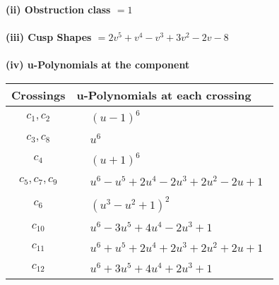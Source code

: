 \documentclass[1p]{elsarticle_modified}
\theoremstyle{definition}
\begin{document}
\flushleft \textbf{(ii) Obstruction class $= 1$}\\~\\
\flushleft \textbf{(iii) Cusp Shapes $= 2 v^5+v^4- v^3+3 v^2-2 v-8$}\\~\\
\newpage\renewcommand{\arraystretch}{1}
\flushleft \textbf{(iv) u-Polynomials at the component}\newline \\
\begin{tabular}{m{50pt}|m{274pt}}
Crossings & \hspace{64pt}u-Polynomials at each crossing \\
\hline $$\begin{aligned}c_{1},c_{2}\end{aligned}$$&$\begin{aligned}
&(u-1)^6
\end{aligned}$\\
\hline $$\begin{aligned}c_{3},c_{8}\end{aligned}$$&$\begin{aligned}
&u^6
\end{aligned}$\\
\hline $$\begin{aligned}c_{4}\end{aligned}$$&$\begin{aligned}
&(u+1)^6
\end{aligned}$\\
\hline $$\begin{aligned}c_{5},c_{7},c_{9}\end{aligned}$$&$\begin{aligned}
&u^6- u^5+2 u^4-2 u^3+2 u^2-2 u+1
\end{aligned}$\\
\hline $$\begin{aligned}c_{6}\end{aligned}$$&$\begin{aligned}
&(u^3- u^2+1)^2
\end{aligned}$\\
\hline $$\begin{aligned}c_{10}\end{aligned}$$&$\begin{aligned}
&u^6-3 u^5+4 u^4-2 u^3+1
\end{aligned}$\\
\hline $$\begin{aligned}c_{11}\end{aligned}$$&$\begin{aligned}
&u^6+u^5+2 u^4+2 u^3+2 u^2+2 u+1
\end{aligned}$\\
\hline $$\begin{aligned}c_{12}\end{aligned}$$&$\begin{aligned}
&u^6+3 u^5+4 u^4+2 u^3+1
\end{aligned}$\\
\hline
\end{tabular}\\~\\
\end{document}

